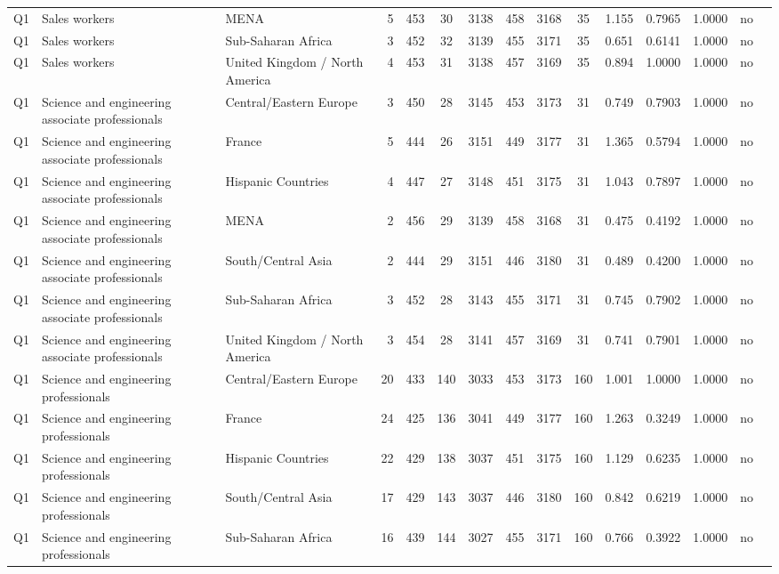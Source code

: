 \begin{longtable}{lllrcccccccccll}
Q1 & Sales workers & MENA & 5 & 453 & 30 & 3138 & 458 & 3168 & 35 & 1.155 & 0.7965 & 1.0000 & no \\
Q1 & Sales workers & Sub-Saharan Africa & 3 & 452 & 32 & 3139 & 455 & 3171 & 35 & 0.651 & 0.6141 & 1.0000 & no \\
Q1 & Sales workers & United Kingdom / North America & 4 & 453 & 31 & 3138 & 457 & 3169 & 35 & 0.894 & 1.0000 & 1.0000 & no \\
Q1 & Science and engineering associate professionals & Central/Eastern Europe & 3 & 450 & 28 & 3145 & 453 & 3173 & 31 & 0.749 & 0.7903 & 1.0000 & no \\
Q1 & Science and engineering associate professionals & France & 5 & 444 & 26 & 3151 & 449 & 3177 & 31 & 1.365 & 0.5794 & 1.0000 & no \\
Q1 & Science and engineering associate professionals & Hispanic Countries & 4 & 447 & 27 & 3148 & 451 & 3175 & 31 & 1.043 & 0.7897 & 1.0000 & no \\
Q1 & Science and engineering associate professionals & MENA & 2 & 456 & 29 & 3139 & 458 & 3168 & 31 & 0.475 & 0.4192 & 1.0000 & no \\
Q1 & Science and engineering associate professionals & South/Central Asia & 2 & 444 & 29 & 3151 & 446 & 3180 & 31 & 0.489 & 0.4200 & 1.0000 & no \\
Q1 & Science and engineering associate professionals & Sub-Saharan Africa & 3 & 452 & 28 & 3143 & 455 & 3171 & 31 & 0.745 & 0.7902 & 1.0000 & no \\
Q1 & Science and engineering associate professionals & United Kingdom / North America & 3 & 454 & 28 & 3141 & 457 & 3169 & 31 & 0.741 & 0.7901 & 1.0000 & no \\
Q1 & Science and engineering professionals & Central/Eastern Europe & 20 & 433 & 140 & 3033 & 453 & 3173 & 160 & 1.001 & 1.0000 & 1.0000 & no \\
Q1 & Science and engineering professionals & France & 24 & 425 & 136 & 3041 & 449 & 3177 & 160 & 1.263 & 0.3249 & 1.0000 & no \\
Q1 & Science and engineering professionals & Hispanic Countries & 22 & 429 & 138 & 3037 & 451 & 3175 & 160 & 1.129 & 0.6235 & 1.0000 & no \\
Q1 & Science and engineering professionals & South/Central Asia & 17 & 429 & 143 & 3037 & 446 & 3180 & 160 & 0.842 & 0.6219 & 1.0000 & no \\
Q1 & Science and engineering professionals & Sub-Saharan Africa & 16 & 439 & 144 & 3027 & 455 & 3171 & 160 & 0.766 & 0.3922 & 1.0000 & no \\

\end{longtable}
